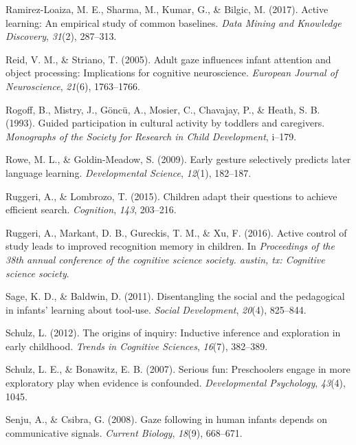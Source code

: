 \documentclass[a4paper,man,apacite,floatsintext]{apa6}
\begin{document}
\hypertarget{ref-ramirez2017active}{}
Ramirez-Loaiza, M. E., Sharma, M., Kumar, G., \& Bilgic, M. (2017).
Active learning: An empirical study of common baselines. \emph{Data
Mining and Knowledge Discovery}, \emph{31}(2), 287--313.

\hypertarget{ref-reid2005adult}{}
Reid, V. M., \& Striano, T. (2005). Adult gaze influences infant
attention and object processing: Implications for cognitive
neuroscience. \emph{European Journal of Neuroscience}, \emph{21}(6),
1763--1766.

\hypertarget{ref-rogoff1993guided}{}
Rogoff, B., Mistry, J., Göncü, A., Mosier, C., Chavajay, P., \& Heath,
S. B. (1993). Guided participation in cultural activity by toddlers and
caregivers. \emph{Monographs of the Society for Research in Child
Development}, i--179.

\hypertarget{ref-rowe2009early}{}
Rowe, M. L., \& Goldin-Meadow, S. (2009). Early gesture selectively
predicts later language learning. \emph{Developmental Science},
\emph{12}(1), 182--187.

\hypertarget{ref-ruggeri2015children}{}
Ruggeri, A., \& Lombrozo, T. (2015). Children adapt their questions to
achieve efficient search. \emph{Cognition}, \emph{143}, 203--216.

\hypertarget{ref-ruggeri2016active}{}
Ruggeri, A., Markant, D. B., Gureckis, T. M., \& Xu, F. (2016). Active
control of study leads to improved recognition memory in children. In
\emph{Proceedings of the 38th annual conference of the cognitive science
society. austin, tx: Cognitive science society}.

\hypertarget{ref-sage2011disentangling}{}
Sage, K. D., \& Baldwin, D. (2011). Disentangling the social and the
pedagogical in infants' learning about tool-use. \emph{Social
Development}, \emph{20}(4), 825--844.

\hypertarget{ref-schulz2012origins}{}
Schulz, L. (2012). The origins of inquiry: Inductive inference and
exploration in early childhood. \emph{Trends in Cognitive Sciences},
\emph{16}(7), 382--389.

\hypertarget{ref-schulz2007serious}{}
Schulz, L. E., \& Bonawitz, E. B. (2007). Serious fun: Preschoolers
engage in more exploratory play when evidence is confounded.
\emph{Developmental Psychology}, \emph{43}(4), 1045.

\hypertarget{ref-senju2008gaze}{}
Senju, A., \& Csibra, G. (2008). Gaze following in human infants depends
on communicative signals. \emph{Current Biology}, \emph{18}(9),
668--671.
\end{document}
